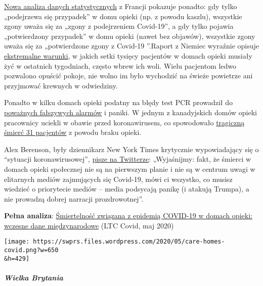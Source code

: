 \href{https://covidinfos.net/covid19/deces-dus-au-covid-19-le-nombre-officiel-de-morts-en-france-est-il-surestime/502/}{Nowa
analiza danych statystycznych} z Francji pokazuje ponadto: gdy tylko
„podejrzewa się przypadek'' w domu opieki (np. z powodu kaszlu),
wszystkie zgony uważa się za „zgony z podejrzeniem Covid-19'', a gdy
tylko pojawia „potwierdzony przypadek'' w domu opieki (nawet bez
objawów), wszystkie zgony uważa się za „potwierdzone zgony z Covid-19
''.Raport z Niemiec wyraźnie opisuje
\href{https://www.rnd.de/gesundheit/corona-ist-mir-egal-warum-helga-witt-kronshage-86-lieber-sterben-will-als-eingesperrt-zu-sein-3MEBDIOBEFA6BDULC4N5WGZJG4.html}{ekstremalne
warunki}, w jakich setki tysięcy pacjentów w domach opieki musiały żyć w
ostatnich tygodniach, często wbrew ich woli. Wielu pacjentom ledwo
pozwalono opuścić pokoje, nie wolno im było wychodzić na świeże
powietrze ani przyjmować krewnych w odwiedziny.

Ponadto w kilku domach opieki podatny na błędy test PCR prowadził do
\href{https://www.wjhl.com/local-coronavirus-coverage/agape-nursing-home-says-residents-who-tested-positive-for-covid-19-were-false-positives/}{poważnych
fałszywych alarmów} i paniki. W jednym z kanadyjskich domów opieki
pracownicy uciekli w obawie przed koronawirusem, co spowodowało
\href{https://www.nytimes.com/2020/04/16/world/canada/montreal-nursing-homes-coronavirus.html}{tragiczną
śmierć 31 pacjentów} z powodu braku opieki.

Alex Berenson, były dziennikarz New York Times krytycznie wypowiadający
się o ``sytuacji koronawirusowej'',
\href{https://twitter.com/AlexBerenson/status/1257496834043531267}{pisze
na Twitterze}: „Wyjaśnijmy: fakt, że śmierci w domach opieki społecznej
nie są na pierwszym planie i nie są w centrum uwagi w elitarnych mediów
zajmujących się Covid-19, mówi ci wszystko, co musisz wiedzieć o
priorytecie mediów -- media podsycają panikę (i atakują Trumpa), a nie
prowadzą dobrej narracji prozdrowotnej''.

\textbf{Pełna analiza}:
\href{https://ltccovid.org/2020/04/12/mortality-associated-with-covid-19-outbreaks-in-care-homes-early-international-evidence/}{Śmiertelność
związana z epidemią COVID-19 w domach opieki: wczesne dane
międzynarodowe} (LTC Covid, maj 2020)

\texttt{[image: https://swprs.files.wordpress.com/2020/05/care-homes-covid.png?w=650\\\&h=429]}

\hypertarget{wielka-brytania}{%
\subparagraph{\texorpdfstring{\textbf{Wielka
Brytania}}{Wielka Brytania}}\label{wielka-brytania}}

